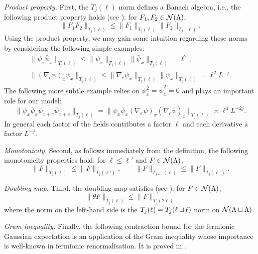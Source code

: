 \documentclass[11pt]{amsart}
\numberwithin{equation}{section}
\numberwithin{theorem}{section}
\newcommand{\1}{{\bf 1}}
\begin{document}
\smallskip\noindent\emph{Product property.}
First, the $T_j(\ell)$ norm defines a Banach algebra,
i.e., the following product property holds  (see \cite[Proposition~3.7]{MR3332938}):
for $F_{1},F_{2} \in \mathcal N(\Lambda)$,
\begin{equation} \label{e:T-product}
  \|F_1F_2\|_{T_j(\ell)} \leq \|F_1\|_{T_j(\ell)}\|F_2\|_{T_j(\ell)}.
\end{equation}
Using the product property, we may gain some intuition regarding these norms by  considering the following simple examples:
\begin{gather}
  \|\psi_x\bar\psi_x\|_{T_j(\ell)} \leq \|\psi_x\|_{T_j(\ell)} \|\bar\psi_x\|_{T_j(\ell)}= \ell^2, \\
  \|(\nabla_e\psi)_x\bar\psi_x\|_{T_j(\ell)}
  \leq \|\nabla_e\psi_x\|_{T_j(\ell)} \|\bar\psi_x\|_{T_j(\ell)} = \ell^2 L^{-j}.
\end{gather}
The following more subtle example relies on $\psi_{x}^{2}=\bar\psi_{x}^{2}=0$
and plays an important role for our model:
\begin{equation}
  \|\psi_x\bar\psi_x\psi_{x+e}\bar\psi_{x+e}\|_{T_j(\ell)}
  = \|\psi_x\bar\psi_x(\nabla_e\psi)_{x}(\nabla_e\bar\psi)_{x}\|_{T_j(\ell)}
  \asymp \ell^4L^{-2j}.
\end{equation}
In general each factor of the fields contributes a factor $\ell$ and
each derivative a factor $L^{-j}$.

\smallskip\noindent\emph{Monotonicity.} 
Second, as follows immediately from the definition, the following monotonicity properties hold:
for $\ell\leq \ell'$ and $F \in \mathcal N(\Lambda)$,
\begin{equation} \label{e:T-monotone}
  \|F\|_{T_j(\ell)} \leq  \|F\|_{T_j(\ell')}, \qquad
  \|F\|_{T_{j+1}(\ell)} \leq  \|F\|_{T_j(\ell')}.
\end{equation}

\smallskip\noindent\emph{Doubling map.} 
Third, the doubling map satisfies (see \cite[Proposition~3.12]{MR3332938}): for $F \in \mathcal N(\Lambda)$,
\begin{equation} \label{e:theta-bd}
  \|\theta F\|_{T_j(\ell)} \leq \|F\|_{T_j(2\ell)}
\end{equation}
where the norm on the left-hand side is the
$T_j(\ell) = T_j(\ell\sqcup \ell)$
 norm on $\mathcal N(\Lambda\sqcup\Lambda)$.

 \smallskip\noindent\emph{Gram inequality.} 
Finally, the following contraction bound for the fermionic Gaussian
expectation is an application of the Gram inequality whose importance
is well-known in fermionic renormalisation.  It is proved in
\cite[Proposition~3.19]{MR3332938}.
\end{document}
